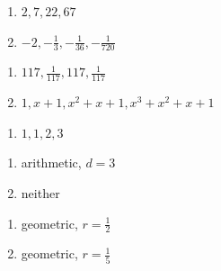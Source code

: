 \documentclass{ximera}
\begin{document}
\begin{multicols}{2}
\begin{enumerate}
\setcounter{enumi}{\value{HW}}

\item $2, 7, 22, 67$
\item $-2, -\frac{1}{3}, -\frac{1}{36}, -\frac{1}{720}$

\setcounter{HW}{\value{enumi}}
\end{enumerate}
\end{multicols}

\begin{multicols}{2}
\begin{enumerate}
\setcounter{enumi}{\value{HW}}

\item $117, \frac{1}{117}, 117, \frac{1}{117}$
\item $1, x + 1, x^{2} + x + 1, x^{3} + x^{2} + x + 1 $

\setcounter{HW}{\value{enumi}}
\end{enumerate}
\end{multicols}

\begin{multicols}{2}
\begin{enumerate}
\setcounter{enumi}{\value{HW}}

\item $1, 1, 2, 3$

\setcounter{HW}{\value{enumi}}
\end{enumerate}
\end{multicols}

\begin{multicols}{2}
\begin{enumerate}
\setcounter{enumi}{\value{HW}}

\item  arithmetic, $d = 3$

\item  neither


\setcounter{HW}{\value{enumi}}
\end{enumerate}
\end{multicols}

\begin{multicols}{2}
\begin{enumerate}
\setcounter{enumi}{\value{HW}}

\item  geometric, $r = \frac{1}{2}$

\item  geometric, $r = \frac{1}{5}$

\setcounter{HW}{\value{enumi}}
\end{enumerate}
\end{multicols}
\end{document}
